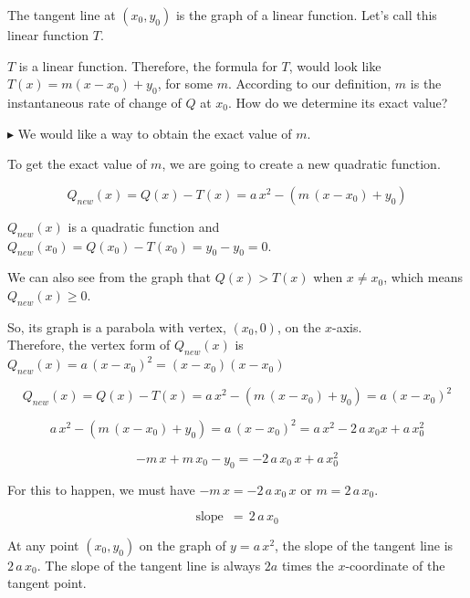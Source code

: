 \documentclass{ximera}
\begin{document}
\begin{explanation}

The tangent line at $(x_0, y_0)$ is the graph of a linear function. Let's call this linear function $T$.


$T$ is a linear function. Therefore, the formula for $T$, would look like $T(x) = m(x - x_0) + y_0$, for some $m$.  According to our definition, $m$ is the instantaneous rate of change of $Q$ at $x_0$.  How do we determine its exact value?


$\blacktriangleright$ We would like a way to obtain the exact value of $m$. 



To get the exact value of $m$, we are going to create a new quadratic function.



\[
Q_{new}(x) = Q(x) - T(x) = a \, x^2 - (m \, (x - x_0) + y_0)
\]



$Q_{new}(x)$ is a quadratic function and $Q_{new}(x_0) = Q(x_0) - T(x_0) = y_0 - y_0 = 0$. 

We can also see from the graph that $Q(x) > T(x)$ when $x \ne x_0$, which means $Q_{new}(x) \geq 0$.


So, its graph is a parabola with vertex, $(x_0, 0)$, on the $x$-axis.  \\


Therefore, the vertex form of $Q_{new}(x)$ is $Q_{new}(x) = a \, (x - x_0)^2 = (x - x_0)(x - x_0)$  






\[
Q_{new}(x) = Q(x) - T(x) = a \, x^2 - (m \, (x - x_0) + y_0) = a \, (x - x_0)^2
\]




\[
a \, x^2 - (m \, (x - x_0) + y_0) = a \, (x - x_0)^2 = a \, x^2 - 2 \, a \, x_0 x + a \, x_0^2
\]



\[
 -m \, x + m \, x_0 - y_0 =   - 2 \, a \, x_0 \, x + a \, x_0^2
\]


For this to happen, we must have $-m \, x = - 2 \, a \, x_0 \, x$ or \textbf{$m = 2 \, a \, x_0$}. 



\[ \text{slope } \, = \, 2 \, a \, x_0  \]



\end{explanation}

At any point $(x_0, y_0)$ on the graph of $y = a \, x^2$, the slope of the tangent line is $2 \, a \, x_0$.  The slope of the tangent line is always $2a$ times the $x$-coordinate of the tangent point.
\end{document}
